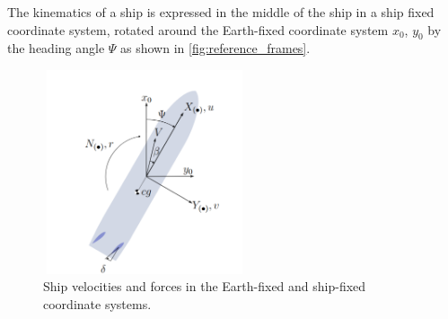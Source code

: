 \noindent The kinematics of a ship is expressed in the middle of the ship in a ship fixed coordinate system, rotated around the Earth-fixed coordinate system $x_0$, $y_0$ by the heading angle $\Psi$ as shown in \autoref{fig:reference_frames}. 
\begin{figure}[h!]
    \centering
    \includegraphics[width=6cm, height=6cm]{figures/reference_frames.png}
    \caption{Ship velocities and forces in the Earth-fixed and ship-fixed coordinate systems.}
    \label{fig:reference_frames}
\end{figure}


